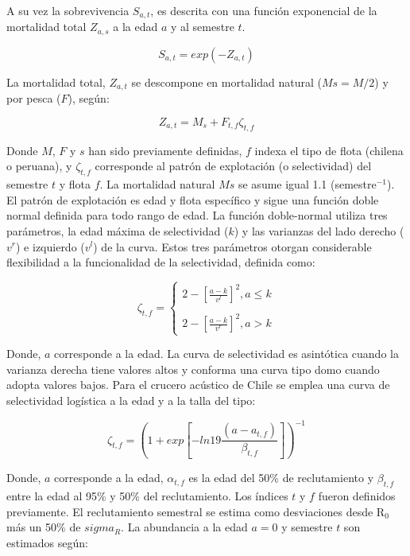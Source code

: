 \documentclass[letter,11pt]{article}
\begin{document}
A su vez la sobrevivencia $S_{a,t}$, es descrita con una funci\'on
exponencial de la mortalidad total $Z_{a,s}$ a la edad $a$ y al
semestre $t$.

\begin{equation}
S_{a,t}=exp(-Z_{a,t})
\end{equation}

La mortalidad total, $Z_{a,t}$ se descompone en mortalidad natural
($Ms=M/2$) y por pesca ($F$), seg\'un:

\begin{equation}
Z_{a,t}=M_s + F_{t,f}\zeta_{t,f}
\end{equation}

Donde $M$, $F$ y $s$ han sido previamente definidas, $f$ indexa
el tipo de flota (chilena o peruana), y $\zeta_{t,f}$ corresponde al
patr\'on de explotaci\'on (o selectividad) del semestre $t$ y flota $f$.
La mortalidad natural $Ms$ se asume igual 1.1 (semestre$^{-1}$). El patr\'on
de explotaci\'on es edad y flota espec\'ifico y sigue una funci\'on doble
normal definida para todo rango de edad. La funci\'on doble-normal utiliza
tres par\'ametros, la edad m\'axima de selectividad ($k$) y las varianzas
del lado derecho ($v^r$) e izquierdo ($v^l$) de la curva. Estos tres
par\'ametros otorgan considerable flexibilidad a la funcionalidad de la
selectividad, definida como:

\begin{equation}
\zeta_{t,f} = \left\lbrace
\begin{array}{ll}
2- \left[\frac{a-k}{v^l}\right]^2 , a \leq k\\
\\
2- \left[\frac{a-k}{v^r}\right]^2 , a > k
\end{array}
\right.
\end{equation}

Donde, $a$ corresponde a la edad. La curva de selectividad es
asint\'otica cuando la varianza derecha tiene valores altos y conforma una
curva tipo domo cuando adopta valores bajos. Para el crucero ac\'ustico de
Chile se emplea una curva de selectividad log\'istica a la edad y a la
talla del tipo:

\begin{equation}
\zeta_{t,f}=\left(1+exp\left[-ln19\frac{(a-a_{t,f})}{\beta_{t,f}}\right]\right)^{-1}
\end{equation}

Donde, $a$ corresponde a la edad, $\alpha_{t,f}$ es la edad del 50\%
de reclutamiento y $\beta_{t,f}$ entre la edad al 95\% y 50\% del
reclutamiento. Los \'indices $t$ y $f$ fueron definidos previamente.
El reclutamiento semestral se estima como desviaciones desde R$_{0}$ m\'as
un 50\% de $sigma_{R}$. La abundancia a la edad $a=0$ y semestre $t$
son estimados seg\'un:
\end{document}
